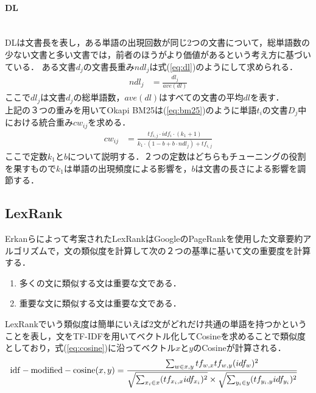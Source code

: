 \paragraph{DL}\ \\
DLは文書長を表し，ある単語の出現回数が同じ2つの文書について，総単語数の少ない文書と多い文書では，前者のほうがより価値があるという考え方に基づいている．
ある文書$d_j$の文書長重み$ndl_j$は式(\ref{eq:dl})のようにして求められる．
\begin{equation}
\begin{aligned}
\label{eq:dl}
ndl_{j} & = \frac{dl_j}{ave(dl)}
\end{aligned}
\end{equation}
ここで$dl_j$は文書$d_j$の総単語数，$ave(dl)$はすべての文書の平均$dl$を表す．
\\
上記の３つの重みを用いてOkapi BM25は(\ref{eq:bm25})のように単語$t_i$の文書$D_j$中における統合重み$cw_{ij}$を求める．
\begin{equation}
\begin{aligned}
\label{eq:bm25}
cw_{ij} & = \frac{tf_{i,j} \cdot idf_{i} \cdot (k_1+ 1)}{k_1 \cdot (1 - b + b \cdot ndl_{j}  ) + tf_{i,j}  }
\end{aligned}
\end{equation}
ここで定数$k_1$と$b$について説明する．２つの定数はどちらもチューニングの役割を果すもので$k_1$は単語の出現頻度による影響を，$b$は文書の長さによる影響を調節する．
\subsection{LexRank}
Erkanら\cite{lexRank}によって考案されたLexRankはGoogleのPageRank\cite{pageRank1999}を使用した文章要約アルゴリズムで，文の類似度を計算して次の２つの基準に基いて文の重要度を計算する．
\begin{enumerate}
  \item 多くの文に類似する文は重要な文である．
  \item 重要な文に類似する文は重要な文である．
\end{enumerate}
LexRankでいう類似度は簡単にいえば2文がどれだけ共通の単語を持つかということを表し，文をTF-IDFを用いてベクトル化してCosineを求めることで類似度としており，式(\ref{eq:cosine})に沿ってベクトル$x$と$y$のCosineが計算される．
\begin{equation}
\begin{aligned}
\label{eq:cosine}
{\rm idf-modified-cosine}(x,y) & = \frac{\sum_{w \in x,y} tf_{w,x} tf_{w,y} (idf_w)^2} {\sqrt{ \sum_{x_i \in x} ( tf_{x_i,x} idf_{x_i} )^2  } \times \sqrt{ \sum_{y_i \in y} ( tf_{y_i,y} idf_{y_i} )^2  }}
\end{aligned}
\end{equation}

